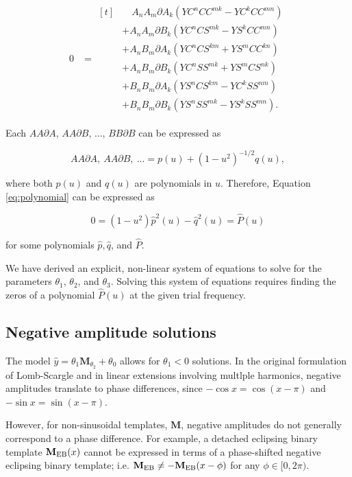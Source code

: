 \documentclass[apj]{emulateapj}
\newcommand{\Mshft}{\mathbf{M}_{\theta_2}}
\newcommand{\dA}{\partial A}
\newcommand{\dB}{\partial B}
\begin{document}
\begin{align}\label{eq:polynomial}
0 &= 
\begin{aligned}[t]
&\quad A_nA_m\dA_k\left(YC^nCC^{mk} -  YC^kCC^{mn}\right)\\
&+ A_nA_m\dB_k\left(YC^nCS^{mk} - YS^kCC^{mn}\right)\\
&+ A_nB_m\dA_k\left(YC^nCS^{km} + YS^mCC^{kn}\right)\\
&+ A_nB_m\dB_k\left(YC^nSS^{mk} + YS^mCS^{nk}\right)\\
&+ B_nB_m\dA_k\left(YS^nCS^{km} - YC^kSS^{nm}\right)\\
&+ B_nB_m\dB_k\left(YS^nSS^{mk} - YS^kSS^{mn}\right).
\end{aligned}
\end{align}

Each $AA\dA$, $AA\dB$, ..., $BB\dB$ can be expressed as 

\begin{equation}
AA\dA,~AA\dB,~...= p(u) + (1 - u^2)^{-1/2}q(u),
\end{equation}

\noindent where both $p(u)$ and $q(u)$ are polynomials in $u$. Therefore, Equation
\ref{eq:polynomial} can be expressed as

\begin{equation}
0 = (1 - u^2)\hat{p}^2(u) - \hat{q}^2(u) = \hat{P}(u)
\end{equation}

\noindent for some polynomials $\hat{p}, \hat{q}$, and $\hat{P}$.


We have derived an explicit, non-linear system of equations to solve for
the parameters $\theta_1$, $\theta_2$, and $\theta_3$. Solving this system of equations
requires finding the zeros of a polynomial $\hat{P}(u)$ at the given trial frequency.


\subsection{Negative amplitude solutions}
The model $\hat{y}= \theta_1\Mshft + \theta_0$ allows for $\theta_1 < 0$ solutions. 
In the original formulation of Lomb-Scargle and in linear
extensions involving multlple harmonics, negative amplitudes translate to
phase differences, since $-\cos{x} = \cos(x - \pi)$ and $-\sin{x} = \sin(x - \pi)$.

However, for non-sinusoidal templates, $\mathbf{M}$, negative amplitudes
do not generally correspond to a phase difference. For example, a 
detached eclipsing binary template $\mathbf{M}_{\rm EB}(x)$ cannot be 
expressed in terms of a phase-shifted negative eclipsing binary template; i.e.
$\mathbf{M}_{\rm EB} \neq -\mathbf{M}_{\rm EB}(x - \phi)$ for any $\phi\in[0, 2\pi)$.
\end{document}
